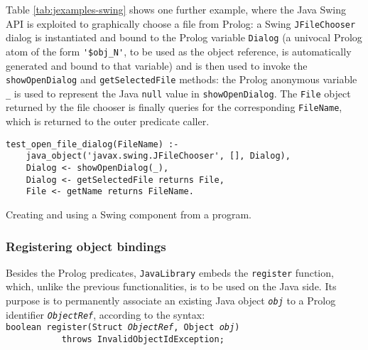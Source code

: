 Table \ref{tab:jexamples-swing} shows one further example, where the Java Swing API is
exploited to graphically choose a file from Prolog: a Swing \texttt{JFileChooser} dialog is instantiated and bound to the Prolog variable \texttt{Dialog} (a univocal Prolog atom of the form \verb|'$obj_N'|, to be used as the object reference, is automatically generated and bound to that variable) and is then used to invoke the \texttt{showOpenDialog} and
\texttt{getSelectedFile} methods: the Prolog anonymous variable \texttt{\_} is used to represent the Java \texttt{null} value in \texttt{showOpenDialog}.
%
The \texttt{File} object returned by the file chooser is finally queries for the corresponding \texttt{FileName}, which is returned to the outer predicate caller.


\begin{table}
\begin{verbatim}
test_open_file_dialog(FileName) :-
    java_object('javax.swing.JFileChooser', [], Dialog),
    Dialog <- showOpenDialog(_),
    Dialog <- getSelectedFile returns File,
    File <- getName returns FileName.
\end{verbatim}
\caption{Creating and using a Swing component from a \tuprolog{} program.}
\label{tab:jexamples-swing}
\end{table}

\subsubsection{Registering object bindings}
\label{sssec:register}

Besides the Prolog predicates, \texttt{JavaLibrary} embeds the \texttt{register} function, which, unlike the previous functionalities, is to be used on the Java side.
%
Its purpose is to permanently associate an existing Java object \texttt{\textit{obj}} to a Prolog identifier \texttt{\textit{ObjectRef}}, according to the syntax:\\

\texttt{boolean register(Struct \textit{ObjectRef}, Object \textit{obj})\\
    \mbox{~~~~~~~~~~~}throws InvalidObjectIdException;}\\

